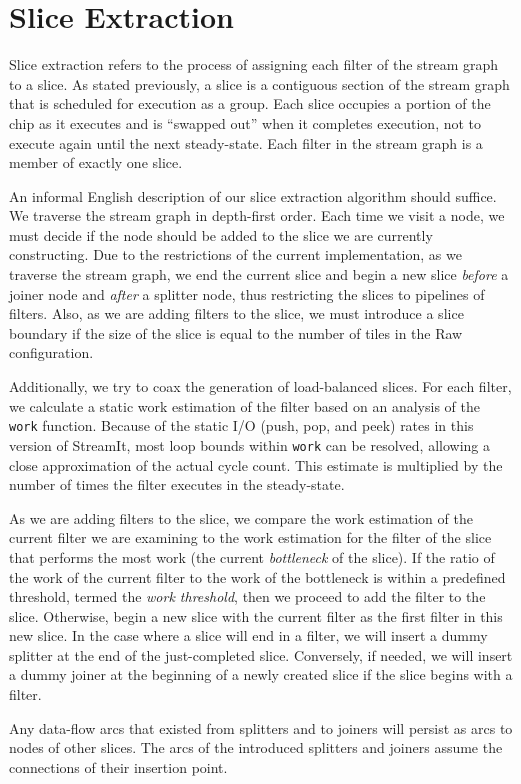 \section{Slice Extraction}
\label{sec:extract}
Slice extraction refers to the process of assigning each filter of the
stream graph to a slice.  As stated previously, a slice is a
contiguous section of the stream graph that is scheduled for execution
as a group. Each slice occupies a portion of the chip as it executes
and is ``swapped out'' when it completes execution, not to execute
again until the next steady-state.  Each filter in the stream graph is
a member of exactly one slice.

An informal English description of our slice extraction algorithm
should suffice.  We traverse the stream graph in depth-first order.
Each time we visit a node, we must decide if the node should be added
to the slice we are currently constructing.  Due to the restrictions
of the current implementation, as we traverse the stream graph, we end
the current slice and begin a new slice {\it before} a joiner node and
{\it after} a splitter node, thus restricting the slices to pipelines
of filters.  Also, as we are adding filters to the slice, we must
introduce a slice boundary if the size of the slice is equal to the
number of tiles in the Raw configuration. 

Additionally, we try to coax the generation of load-balanced slices.
For each filter, we calculate a static work estimation of the filter
based on an analysis of the {\tt work} function.  Because of the
static I/O (push, pop, and peek) rates in this version of StreamIt,
most loop bounds within {\tt work} can be resolved, allowing a close
approximation of the actual cycle count.  This estimate is multiplied
by the number of times the filter executes in the steady-state.

As we are adding filters to the slice, we compare the work estimation
of the current filter we are examining to the work estimation for the
filter of the slice that performs the most work (the current {\it
bottleneck} of the slice).  If the ratio of the work of the current
filter to the work of the bottleneck is within a predefined
threshold, termed the {\it work threshold}, then we proceed to add the
filter to the slice.  Otherwise, begin a new slice with the current
filter as the first filter in this new slice. In the case where a
slice will end in a filter, we will insert a dummy splitter at the end
of the just-completed slice.  Conversely, if needed, we will insert a
dummy joiner at the beginning of a newly created slice if the slice
begins with a filter.

Any data-flow arcs that existed from splitters and to joiners will
persist as arcs to nodes of other slices.  The arcs of the introduced
splitters and joiners assume the connections of their insertion point.

